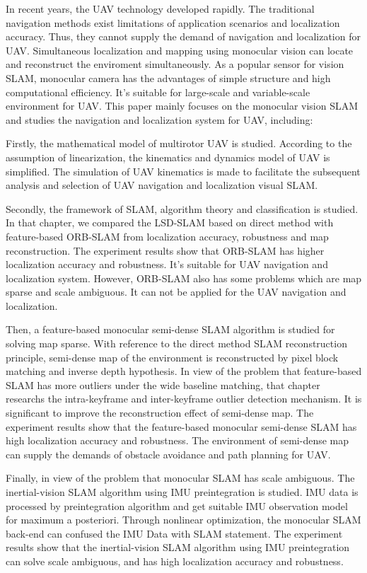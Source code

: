 \begin{englishabstract}

In recent years, the UAV technology developed rapidly. The traditional navigation methods exist limitations of application scenarios and localization accuracy. Thus, they cannot supply the demand of navigation and localization for UAV. Simultaneous localization and mapping using monocular vision can locate and reconstruct the enviroment simultaneously.  
As a popular sensor for vision SLAM, monocular camera has the advantages of simple structure and high computational efficiency. It's suitable for large-scale and variable-scale environment for UAV. This paper mainly focuses on the monocular vision SLAM and studies the navigation and localization system for UAV, including:

Firstly, the mathematical model of multirotor UAV is studied. According to the assumption of linearization, the kinematics and dynamics model of UAV is simplified. The simulation of UAV  kinematics is made to facilitate the subsequent analysis and selection of UAV navigation and localization visual SLAM.

Secondly, the framework of SLAM, algorithm theory and classification is studied. In that chapter, we compared the LSD-SLAM based on direct method with feature-based ORB-SLAM from localization accuracy, robustness and map reconstruction. The experiment results show that ORB-SLAM has higher localization accuracy and robustness. It's suitable for UAV navigation and localization system. However, ORB-SLAM also has some problems which are map sparse and scale ambiguous. It can not be applied for the UAV navigation and localization.

Then, a feature-based monocular semi-dense SLAM algorithm is studied for solving map sparse. With reference to the direct method SLAM reconstruction principle, semi-dense map of the environment is reconstructed by pixel block matching and inverse depth hypothesis. In view of the problem that feature-based SLAM has more outliers under the wide baseline matching, that chapter researchs the intra-keyframe and inter-keyframe outlier detection mechanism. It is significant to improve the reconstruction effect of semi-dense map. The 
experiment results show that the feature-based monocular semi-dense SLAM has high localization accuracy and robustness. The environment of semi-dense map can supply the demands of obstacle avoidance and path planning for UAV.

Finally, in view of the problem that monocular SLAM has scale ambiguous. The inertial-vision SLAM algorithm using IMU preintegration is studied. IMU data is processed by preintegration algorithm and get suitable IMU observation model for maximum a posteriori.  Through nonlinear optimization, the monocular SLAM back-end can confused the IMU Data with SLAM statement. The experiment results show that the inertial-vision SLAM algorithm using IMU preintegration can solve scale ambiguous, and has high localization accuracy and robustness. 
  
  

\end{englishabstract}
